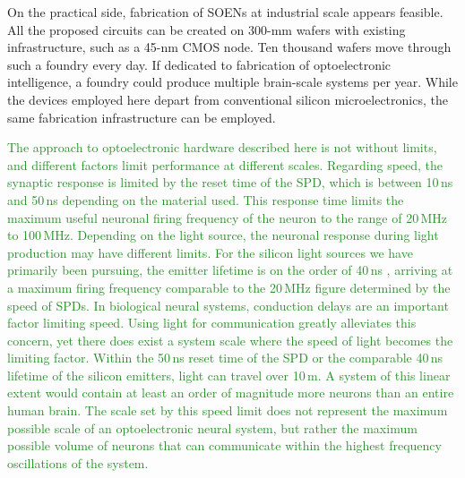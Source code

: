 \documentclass[twocolumn]{article}
\begin{document}
{On the practical side, fabrication of SOENs at industrial scale appears feasible. All the proposed circuits can be created on 300-mm wafers with existing infrastructure, such as a 45-nm CMOS node. Ten thousand wafers move through such a foundry every day. If dedicated to fabrication of optoelectronic intelligence, a foundry could produce multiple brain-scale systems per year. While the devices employed here depart from conventional silicon microelectronics, the same fabrication infrastructure can be employed. 

\textcolor{ForestGreen}{The approach to optoelectronic hardware described here is not without limits, and different factors limit performance at different scales. Regarding speed, the synaptic response is limited by the reset time of the SPD, which is between 10\,ns and 50\,ns depending on the material used. This response time limits the maximum useful neuronal firing frequency of the neuron to the range of 20\,MHz to 100\,MHz. Depending on the light source, the neuronal response during light production may have different limits. For the silicon light sources we have primarily been pursuing, the emitter lifetime is on the order of 40\,ns \cite{buta2020}, arriving at a maximum firing frequency comparable to the 20\,MHz figure determined by the speed of SPDs. In biological neural systems, conduction delays are an important factor limiting speed. Using light for communication greatly alleviates this concern, yet there does exist a system scale where the speed of light becomes the limiting factor. Within the 50\,ns reset time of the SPD or the comparable 40\,ns lifetime of the silicon emitters, light can travel over 10\,m. A system of this linear extent would contain at least an order of magnitude more neurons than an entire human brain. The scale set by this speed limit does not represent the maximum possible scale of an optoelectronic neural system, but rather the maximum possible volume of neurons that can communicate within the highest frequency oscillations of the system.}

}
\end{document}
